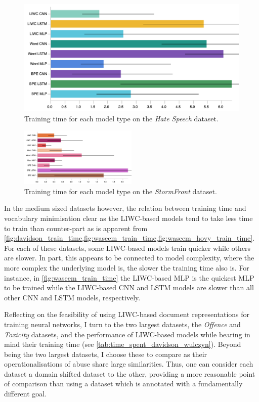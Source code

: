 \begin{figure}[h]
    \centering
    \includegraphics[width=\textwidth]{waseem_hovy_train_time.pdf}
    \caption{Training time for each model type on the \textit{Hate Speech} dataset.}
    \label{fig:waseem_hovy_train_time}
\end{figure}
\begin{figure}[h]
  \centering
  \includegraphics[width=0.50\textwidth]{garcia_train_time.pdf}
  \caption{Training time for each model type on the \textit{StormFront} dataset.}
  \label{fig:garcia_train_time}
\end{figure}

In the medium sized datasets however, the relation between training time and vocabulary minimisation clear as the LIWC-based models tend to take less time to train than counter-part as is apparent from \cref{fig:davidson_train_time,fig:waseem_train_time,fig:waseem_hovy_train_time}. For each of these datasets, some LIWC-based models train quicker while others are slower. In part, this appears to be connected to model complexity, where the more complex the underlying model is, the slower the training time also is. For instance, in  \cref{fig:waseem_train_time} the LIWC-based MLP is the quickest MLP to be trained while the LIWC-based CNN and LSTM models are slower than all other CNN and LSTM models, respectively.

Reflecting on the feasibility of using LIWC-based document representations for training neural networks, I turn to the two largest datasets, the \textit{Offence} and \textit{Toxicity} datasets, and the performance of LIWC-based models while bearing in mind their training time (see \cref{tab:time_spent_davidson_wulczyn}). Beyond being the two largest datasets, I choose these to compare as their operationalisations of abuse share large similarities. Thus, one can consider each dataset a domain shifted dataset to the other, providing a more reasonable point of comparison than using a dataset which is annotated with a fundamentally different goal.

